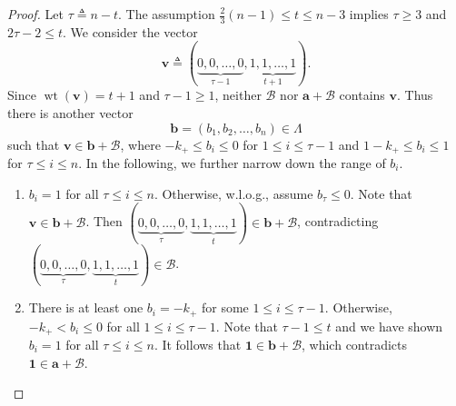 \documentclass[sort&compress]{elsarticle}
\newcommand{\cB}{\mathcal{B}}
\renewcommand{\leq}{\leqslant}
\renewcommand{\geq}{\geqslant}
\newcommand{\vv}{\mathbf{v}}
\newcommand{\vu}{\mathbf{u}}
\newcommand{\va}{\mathbf{a}}
\newcommand{\vb}{\mathbf{b}}
\newcommand{\vc}{\mathbf{c}}
\newcommand{\Zero}{{\mathbf{0}}}
\newcommand{\One}{{\mathbf{1}}}
\DeclareMathOperator{\wt}{wt}
\newcommand{\kp}{k_+}
\newcommand{\eqdef}{\triangleq}
\begin{document}
\begin{proof}
  Let $\tau \eqdef n-t$. The assumption $\frac{2}{3}(n-1)\leq t \leq
  n-3$ implies $\tau \geq 3$ and $2\tau-2\leq t$. We consider the
  vector
  \[\vv \eqdef (\underbrace{0,0,\ldots,0}_{\tau-1}, \underbrace{1,1,\ldots,1}_{t+1}).\]
  Since $\wt(\vv)= t+1$ and $\tau-1\geq 1$, neither $\cB$ nor
  $\va+\cB$ contains $\vv$. Thus there is another vector
  \[\vb=(b_1,b_2,\ldots, b_n)\in \Lambda\]
  such that $\vv \in \vb+\cB$, where $-\kp\leq b_i \leq 0$ for $1\leq
  i\leq \tau-1$ and $1-\kp \leq b_i \leq 1$ for $\tau \leq i \leq
  n$. In the following, we further narrow down the range of $b_i$.
  \begin{enumerate}
  \item
    $b_i=1$ for all $\tau \leq i \leq n$. Otherwise, w.l.o.g., assume
    $b_\tau\leq 0$. Note that $\vv\in \vb+\cB$. Then
    $(\underbrace{0,0,\ldots,0}_{\tau},\underbrace{1,1,\ldots,1}_t)\in
    \vb+\cB$, contradicting
    $(\underbrace{0,0,\ldots,0}_{\tau},\underbrace{1,1,\ldots,1}_t)
    \in \cB$.
  \item
    There is at least one $b_i=-\kp$ for some $1\leq i \leq
    \tau-1$. Otherwise, $-\kp< b_i \leq 0$ for all $1\leq i\leq
    \tau-1$. Note that $\tau-1 \leq t$ and we have shown $b_i=1$ for
    all $\tau \leq i \leq n$. It follows that $\One \in \vb+\cB$,
    which contradicts $\One\in \va+\cB$.
  \end{enumerate}
  

\end{proof}
\end{document}
